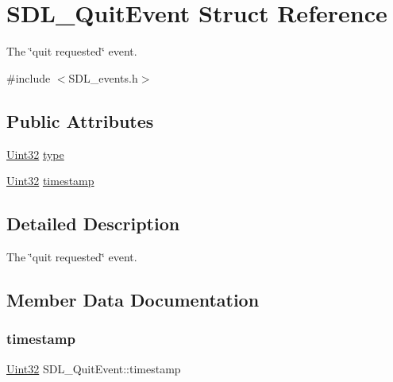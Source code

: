 \hypertarget{struct_s_d_l___quit_event}{}\section{S\+D\+L\+\_\+\+Quit\+Event Struct Reference}
\label{struct_s_d_l___quit_event}


The \char`\"{}quit requested\char`\"{} event.  




{\ttfamily \#include $<$S\+D\+L\+\_\+events.\+h$>$}

\subsection*{Public Attributes}
\begin{DoxyCompactItemize}
\item 
\mbox{\hyperlink{_s_d_l__stdinc_8h_add440eff171ea5f55cb00c4a9ab8672d}{Uint32}} \mbox{\hyperlink{struct_s_d_l___quit_event_a51ab0279e6de40249ba93971a8757cf0}{type}}
\item 
\mbox{\hyperlink{_s_d_l__stdinc_8h_add440eff171ea5f55cb00c4a9ab8672d}{Uint32}} \mbox{\hyperlink{struct_s_d_l___quit_event_a7acd4fa42ca96da8edac146baaa0b433}{timestamp}}
\end{DoxyCompactItemize}


\subsection{Detailed Description}
The \char`\"{}quit requested\char`\"{} event. 

\subsection{Member Data Documentation}
\mbox{\label{struct_s_d_l___quit_event_a7acd4fa42ca96da8edac146baaa0b433}} 
\subsubsection{\texorpdfstring{timestamp}{timestamp}}
{\footnotesize\ttfamily \mbox{\hyperlink{_s_d_l__stdinc_8h_add440eff171ea5f55cb00c4a9ab8672d}{Uint32}} S\+D\+L\+\_\+\+Quit\+Event\+::timestamp}

